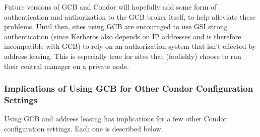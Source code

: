 Future versions of GCB and Condor will hopefully add some form of
authentication and authorization to the GCB broker itself, to help
alleviate these problems.
Until then, sites using GCB are encouraged to use GSI strong
authentication (since Kerberos also depends on IP addresses and is
therefore incompatible with GCB) to rely on an authorization system
that isn't effected by address leasing.
This is especially true for sites that (foolishly) choose to run their
central manager on a private node.


\subsubsection{\label{sec:GCB-config-implications}Implications of
Using GCB for Other Condor Configuration Settings} 

Using GCB and address leasing has implications for a few other Condor
configuration settings.
Each one is described below. 

